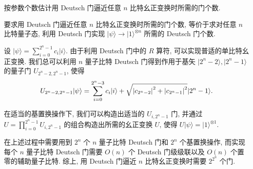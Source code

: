 \documentclass{assignment}
\begin{document}
\begin{prob}
    按参数个数估计用 Deutsch 门逼近任意 $n$ 比特幺正变换时所需的门个数.
\end{prob}
\begin{sol}
    要求用 Deutsch 门逼近任意 $n$ 比特幺正变换时所需的门个数, 等价于求对任意 $n$ 比特量子态, 利用 Deutsch 门实现 $\lvert\psi\rangle\rightarrow\lvert 1\rangle^{\otimes n}$ 所需的 Deutsch 门个数.

    设 $\lvert\psi\rangle=\sum_{i=0}^{2^n-1}c_i\lvert i\rangle$. 由于利用 Deutsch 门中的 $R$ 算符, 可以实现普适的单比特幺正变换. 我们总可以利用 $n$ 量子比特 Deutsch 门得到作用于基矢 $\lvert 2^n-2\rangle,\lvert 2^n-1\rangle$ 的量子门 $U_{2^n-2,2^n-1}$, 使得
    \begin{align}
        U_{2^n-2,2^n-1}\lvert\psi\rangle=\sum_{i=0}^{2^n-3}c_i\lvert i\rangle+\sqrt{\left\lvert c_{2^n-2}\right\rvert^2+\left\lvert c_{2^n-1}\right\rvert^2}\lvert 2^n-1\rangle.
    \end{align}

    在适当的基置换操作下, 我们可以构造出适当的 $U_{i,2^n-1}$ 门, 并通过 $U=\prod_{i=0}^{2^n-1}U_{i,2^n-1}$ 的组合构造出所需的幺正变换 $U$, 使得 $U\lvert\psi\rangle=\lvert 1\rangle^{\otimes 1}$.

    在上述过程中需要用到 $2^n$ 个 $n$ 量子比特 Deutsch 门和 $2^n$ 个基置换操作, 而实现每个 $n$ 量子比特 Deutsch 门需要 $O(n)$ 个 Deutsch 门级级联以及 $O(n)$ 个置零的辅助量子比特. 综上, 用 Deutsch 门逼近 $n$ 比特幺正变换时需要 $2^{2^n}$ 个门.
\end{sol}
\end{document}
